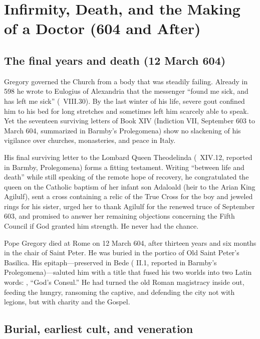 \section{Infirmity, Death, and the Making of a Doctor (604 and After)}

\subsection{The final years and death (12 March 604)}

Gregory governed the Church from a body that was steadily failing. Already in
598 he wrote to Eulogius of Alexandria that the messenger ``found me sick, and
has left me sick'' (\ VIII.30). By the last winter of his life,
severe gout confined him to his bed for long stretches and sometimes left him
scarcely able to speak. Yet the seventeen surviving letters of Book XIV
(Indiction VII, September 603 to March 604, summarized in Barmby's
Prolegomena) show no slackening of his vigilance over churches, monasteries,
and peace in Italy.

His final surviving letter to the Lombard Queen Theodelinda (\
XIV.12, reported in Barmby, Prolegomena) forms a fitting testament. Writing
``between life and death'' while still speaking of the remote hope of recovery,
he congratulated the queen on the Catholic baptism of her infant son Adaloald
(heir to the Arian King Agilulf), sent a cross containing a relic of the True
Cross for the boy and jeweled rings for his sister, urged her to thank Agilulf
for the renewed truce of September 603, and promised to answer her remaining
objections concerning the Fifth Council if God granted him strength. He never
had the chance.

Pope Gregory died at Rome on 12 March 604, after thirteen years and six months
in the chair of Saint Peter. He was buried in the portico of Old Saint Peter's
Basilica. His epitaph---preserved in Bede (\work{Historia Ecclesiastica} II.1,
reported in Barmby's Prolegomena)---saluted him with a title that fused his two
worlds into two Latin words: \latin{Consul Dei}, ``God's Consul.'' He had
turned the old Roman magistracy inside out, feeding the hungry, ransoming the
captive, and defending the city not with legions, but with charity and the
Gospel.

\subsection{Burial, earliest cult, and veneration}

